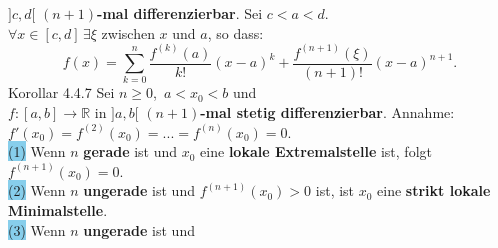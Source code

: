 \documentclass[landscape, 10pt]{article}
\newcommand{\R}{\mathbb{R}}
\begin{document}
\begin{multicols}{3}
                     \textcolor{NavyBlue}{$]c,d[$} 
                     \textbf{$(n+1)$-mal differenzierbar}. Sei 
                     \textcolor{NavyBlue}{$c<a<d$}. \\
                     \textcolor{NavyBlue}{
                     $\forall x\in[c,d]\,\exists\xi$} zwischen 
                     \textcolor{NavyBlue}{$x$} und 
                     \textcolor{NavyBlue}{$a$}, 
                     so dass: 
                     \begin{equation*}
                            f(x)=\sum_{k=0}^n
                            \frac{f^{(k)}(a)}{k!}(x-a)^k
                            +\frac{f^{(n+1)}(\xi)}{(n+1)!}
                            (x-a)^{n+1}.
                     \end{equation*}
              \colorbox{BurntOrange}{Korollar 4.4.7} 
                     Sei \textcolor{NavyBlue}{
                     $n\geqslant0$},\,
                     \textcolor{NavyBlue}{$a<x_0<b$} und \\
                     \textcolor{NavyBlue}
                     {$f:[a,b]\longrightarrow\R$} 
                     in \textcolor{NavyBlue}{$]a,b[$} 
                     \textbf{$(n+1)$-mal stetig 
                     differenzierbar}.
                     Annahme: \textcolor{NavyBlue}{
                     $f'(x_0)=f^{(2)}(x_0)=...
                     =f^{(n)}(x_0)=0$}. \\
                     \colorbox{SkyBlue}{(1)} 
                            Wenn \textcolor{NavyBlue}{$n$} 
                            \textbf{gerade} 
                            ist und 
                            \textcolor{NavyBlue}{$x_0$} eine 
                            \textbf{lokale Extremalstelle} 
                            ist, folgt
                            \textcolor{NavyBlue}{
                            $f^{(n+1)}(x_0)=0$}. \\
                     \colorbox{SkyBlue}{(2)} 
                            Wenn \textcolor{NavyBlue}{$n$} 
                            \textbf{ungerade} ist und 
                            \textcolor{NavyBlue}{
                            $f^{(n+1)}(x_0)>0$} ist, ist 
                            \textcolor{NavyBlue}{$x_0$} 
                            eine \textbf{strikt lokale 
                            Minimalstelle}. \\
                     \colorbox{SkyBlue}{(3)} 
                            Wenn \textcolor{NavyBlue}{$n$} 
                            \textbf{ungerade} 
                            ist und \textcolor{NavyBlue}{
}
\end{multicols}
\end{document}
